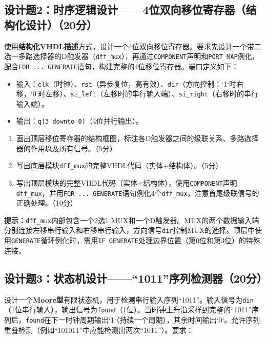 \subsection*{设计题2：时序逻辑设计——4位双向移位寄存器（结构化设计）（20分）}

使用\textbf{结构化VHDL描述}方式，设计一个4位双向移位寄存器。要求先设计一个带二选一多路选择器的D触发器（\texttt{dff\_mux}），再通过\texttt{COMPONENT}声明和\texttt{PORT MAP}例化，配合\texttt{FOR ... GENERATE}语句，构建完整的4位移位寄存器。端口定义如下：

\begin{itemize}
  \item 输入：\texttt{clk}（时钟）、\texttt{rst}（异步复位，高有效）、\texttt{dir}（方向控制：`1`时右移，`0`时左移）、\texttt{si\_left}（左移时的串行输入端）、\texttt{si\_right}（右移时的串行输入端）。
  \item 输出：\texttt{q(3~downto~0)}（4位并行输出）。
\end{itemize}

\begin{enumerate}[label=(\arabic*)]
  \item 画出顶层移位寄存器的结构框图，标注各D触发器之间的级联关系、多路选择器的作用以及所有信号。（5分）
  \item 写出底层模块\texttt{dff\_mux}的完整VHDL代码（实体+结构体）。（5分）
  \item 写出顶层模块的完整VHDL代码（实体+结构体），使用\texttt{COMPONENT}声明\texttt{dff\_mux}，并用\texttt{FOR ... GENERATE}语句例化4个\texttt{dff\_mux}，注意首尾级联信号的正确处理。（10分）
\end{enumerate}

\begin{framed}
\textbf{提示：}\texttt{dff\_mux}内部包含一个2选1 MUX和一个D触发器。MUX的两个数据输入端分别连接左移串行输入和右移串行输入，方向信号\texttt{dir}控制MUX的选择。顶层中使用\texttt{GENERATE}循环例化时，需用\texttt{IF GENERATE}处理边界位置（第0位和第3位）的特殊连接。
\end{framed}

\subsection*{设计题3：状态机设计——“1011”序列检测器（20分）}

设计一个\textbf{Moore型}有限状态机，用于检测串行输入序列``1011''。输入信号为\texttt{din}（1位串行输入），输出信号为\texttt{found}（1位）。当时钟上升沿采样到完整的``1011''序列后，\texttt{found}在下一时钟周期输出`1`（持续一个周期），其余时间输出`0`。允许序列重叠检测（例如``101011''中应能检测出两次``1011''）。要求：

